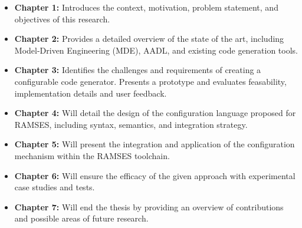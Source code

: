 \begin{itemize}
	\item \textbf{Chapter 1:} Introduces the context, motivation, problem statement, and objectives of this research.
	\item \textbf{Chapter 2:} Provides a detailed overview of the state of the art, including Model-Driven Engineering (MDE), AADL, and existing code generation tools.
	\item \textbf{Chapter 3:} Identifies the challenges and requirements of creating a configurable code generator. Presents a prototype and evaluates feasability, implementation details and user feedback.
	\item \textbf{Chapter 4:} Will detail the design of the configuration language proposed for RAMSES, including syntax, semantics, and integration strategy.
	\item \textbf{Chapter 5:} Will present the integration and application of the configuration mechanism within the \gls{RAMSES} toolchain.
	\item \textbf{Chapter 6:} Will ensure the efficacy of the given approach with experimental case studies and tests.
	\item \textbf{Chapter 7:} Will end the thesis by providing an overview of contributions and possible areas of future research.
\end{itemize}










